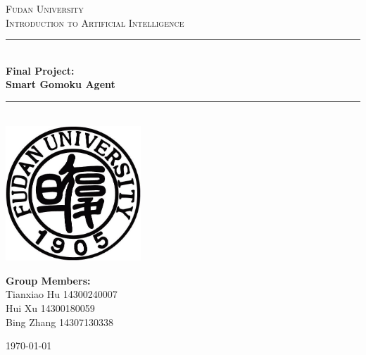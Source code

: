 \documentclass[12pt, oneside,a4paper]{article}
\newcommand{\HRule}{\rule{\linewidth}{0.5mm}}
\begin{document}
\begin{titlepage}
\begin{center}
\textsc{\LARGE Fudan University}\\[1.5cm]
\textsc{\Large Introduction to Artificial Intelligence}\\[0.5cm]
\HRule \\[0.6cm]
{ \huge \bfseries Final Project: }\\[0.4cm]
{ \huge \bfseries Smart Gomoku Agent}\\[0.4cm]

\HRule \\[1.5cm]
\includegraphics[width=2in]{logo.jpg}\\[1cm]

\begin{minipage}{0.4\textwidth}
\begin{flushleft} \large


\begin{center}
\vspace{0.5cm}
\textbf{Group Members:}\\
\vspace{0.4cm}
Tianxiao Hu 14300240007\\
\vspace{0.4cm}
Hui Xu \hspace*{0.8cm} 14300180059\\
\vspace{0.4cm}
Bing Zhang 14307130338
\end{center}
\end{flushleft}
\end{minipage}
\vfill
{\large \today}
\end{center}
\end{titlepage}
\end{document}
